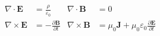 \documentclass{article}
\begin{document}
\[
  \begin{aligned}
    \nabla \cdot \mathbf{E} &= \frac{\rho}{\varepsilon_0} &
    \nabla \cdot \mathbf{B} &= 0 \\
    \nabla \times \mathbf{E} &= -\frac{\partial \mathbf{B}}{\partial t} &
    \nabla \times \mathbf{B} &= \mu_0 \mathbf{J} + \mu_0 \varepsilon_0 \frac{\partial \mathbf{E}}{\partial t}
  \end{aligned}
\]
\end{document}
